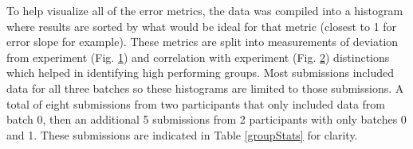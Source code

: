 \begin{figure} %
\caption{}
\label{histogramsAverage}       %
\end{figure}

\begin{figure} %
\caption{}
\label{histogramsCorrelations}       %
\end{figure}

To help visualize all of the error metrics, the data was compiled into a histogram where results are sorted by what would be ideal for that metric (closest to 1 for error slope for example). %
These metrics are split into measurements of deviation from experiment (Fig. \ref{histogramsAverage}) and correlation with experiment (Fig. \ref{histogramsCorrelations}) distinctions which helped in identifying high performing groups. 
Most submissions included data for all three batches so these histograms are limited to those submissions. 
A total of eight submissions from two participants that only included data from batch 0, then an additional 5 submissions from 2 participants with only batches 0 and 1.
These submissions are indicated in Table \ref{groupStats} for clarity.

